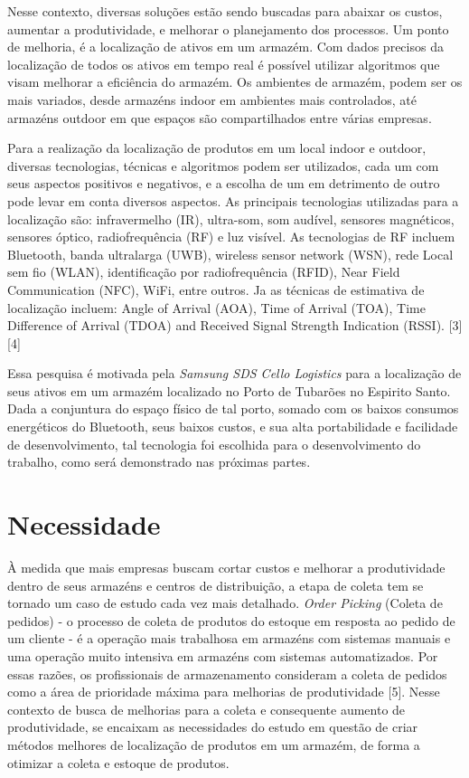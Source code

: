 \documentclass[]{politex}
\begin{document}
Nesse contexto, diversas soluções estão sendo buscadas para abaixar os custos, aumentar a produtividade, e melhorar o planejamento dos processos.
Um ponto de melhoria, é a localização de ativos em um armazém. Com dados precisos da localização de todos os ativos em tempo real é possível utilizar algoritmos que visam melhorar a eficiência do armazém.
Os ambientes de armazém, podem ser os mais variados, desde armazéns indoor em ambientes mais controlados, até armazéns outdoor em que espaços são compartilhados entre várias empresas.

Para a realização da localização de produtos em um local indoor e outdoor, diversas tecnologias, técnicas e algoritmos podem ser utilizados, cada um com seus aspectos positivos e negativos, e a escolha de um em detrimento de outro pode levar em conta diversos aspectos. As principais tecnologias utilizadas para a localização são: infravermelho (IR), ultra-som, som audível, sensores magnéticos, sensores óptico, radiofrequência (RF) e luz visível. As tecnologias de RF incluem Bluetooth, banda ultralarga (UWB), wireless sensor network (WSN), rede Local sem fio (WLAN), identificação por radiofrequência (RFID), Near Field Communication (NFC), WiFi, entre outros.
Ja as técnicas de estimativa de localização incluem: Angle of Arrival (AOA), Time of Arrival (TOA), Time Difference of Arrival (TDOA) and Received Signal Strength Indication (RSSI).  [3][4]

Essa pesquisa é motivada pela \textit{Samsung SDS Cello Logistics} para a localização de seus ativos em um armazém localizado no Porto de Tubarões no Espirito Santo. Dada a conjuntura do espaço físico de tal porto, somado com os baixos consumos energéticos do Bluetooth, seus baixos custos, e sua alta portabilidade e facilidade de desenvolvimento, tal tecnologia foi escolhida para o desenvolvimento do trabalho, como será demonstrado nas próximas partes.

\chapter{Necessidade}
À medida que mais empresas buscam cortar custos e melhorar a produtividade dentro de seus armazéns e centros de distribuição, a etapa de coleta tem se tornado um caso de estudo cada vez mais detalhado. \textit{Order Picking} (Coleta de pedidos) - o processo de coleta de produtos do estoque em resposta ao pedido de um cliente - é a operação mais trabalhosa em armazéns com sistemas manuais e uma operação muito intensiva em armazéns com sistemas automatizados. Por essas razões, os profissionais de armazenamento consideram a coleta de pedidos como a área de prioridade máxima para melhorias de produtividade [5].
Nesse contexto de busca de melhorias para a coleta e consequente aumento de produtividade, se encaixam as necessidades do estudo em questão de criar métodos melhores de localização de produtos em um armazém, de forma a otimizar a coleta e estoque de produtos.
\end{document}
